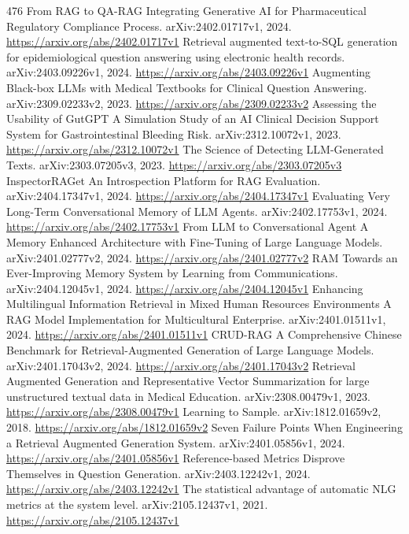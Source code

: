 \documentclass[11pt]{article}
\begin{document}
\begin{thebibliography}{476}
 From RAG to QA-RAG Integrating Generative AI for Pharmaceutical Regulatory Compliance Process. arXiv:2402.01717v1, 2024. \url{https://arxiv.org/abs/2402.01717v1}
 Retrieval augmented text-to-SQL generation for epidemiological question answering using electronic health records. arXiv:2403.09226v1, 2024. \url{https://arxiv.org/abs/2403.09226v1}
 Augmenting Black-box LLMs with Medical Textbooks for Clinical Question Answering. arXiv:2309.02233v2, 2023. \url{https://arxiv.org/abs/2309.02233v2}
 Assessing the Usability of GutGPT A Simulation Study of an AI Clinical Decision Support System for Gastrointestinal Bleeding Risk. arXiv:2312.10072v1, 2023. \url{https://arxiv.org/abs/2312.10072v1}
 The Science of Detecting LLM-Generated Texts. arXiv:2303.07205v3, 2023. \url{https://arxiv.org/abs/2303.07205v3}
 InspectorRAGet An Introspection Platform for RAG Evaluation. arXiv:2404.17347v1, 2024. \url{https://arxiv.org/abs/2404.17347v1}
 Evaluating Very Long-Term Conversational Memory of LLM Agents. arXiv:2402.17753v1, 2024. \url{https://arxiv.org/abs/2402.17753v1}
 From LLM to Conversational Agent A Memory Enhanced Architecture with Fine-Tuning of Large Language Models. arXiv:2401.02777v2, 2024. \url{https://arxiv.org/abs/2401.02777v2}
 RAM Towards an Ever-Improving Memory System by Learning from Communications. arXiv:2404.12045v1, 2024. \url{https://arxiv.org/abs/2404.12045v1}
 Enhancing Multilingual Information Retrieval in Mixed Human Resources Environments A RAG Model Implementation for Multicultural Enterprise. arXiv:2401.01511v1, 2024. \url{https://arxiv.org/abs/2401.01511v1}
 CRUD-RAG A Comprehensive Chinese Benchmark for Retrieval-Augmented Generation of Large Language Models. arXiv:2401.17043v2, 2024. \url{https://arxiv.org/abs/2401.17043v2}
 Retrieval Augmented Generation and Representative Vector Summarization for large unstructured textual data in Medical Education. arXiv:2308.00479v1, 2023. \url{https://arxiv.org/abs/2308.00479v1}
 Learning to Sample. arXiv:1812.01659v2, 2018. \url{https://arxiv.org/abs/1812.01659v2}
 Seven Failure Points When Engineering a Retrieval Augmented Generation System. arXiv:2401.05856v1, 2024. \url{https://arxiv.org/abs/2401.05856v1}
 Reference-based Metrics Disprove Themselves in Question Generation. arXiv:2403.12242v1, 2024. \url{https://arxiv.org/abs/2403.12242v1}
 The statistical advantage of automatic NLG metrics at the system level. arXiv:2105.12437v1, 2021. \url{https://arxiv.org/abs/2105.12437v1}

\end{thebibliography}
\end{document}
